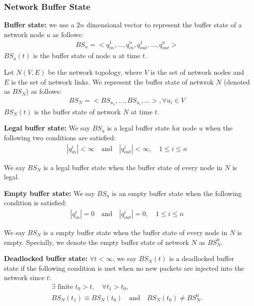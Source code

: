     
   \subsubsection{Network Buffer State}
   
   \textbf{Buffer state:} we use a $2n$ dimensional vector  to represent the buffer state of a network node $u$ as follows: 
   \begin{align}
   BS_u=<q_{in}^{1}, \dots, q_{in}^{n}, q_{out}^{1}, \dots,q_{out}^{n}> \nonumber 
   	\end{align}
   	$BS_u(t)$ is the buffer state of node $u$ at time $t$.
   
   Let $N(V,E)$ be the network topology, where $V$ is the set of network nodes and $E$ is the set of network links. We represent the buffer state of netwrok $N$ (denoted as $BS_N$) as follows:
   \begin{align}
   BS_N=<BS_{u_1},\dots,BS_{u_i},\dots>,\forall u_i \in V \nonumber 
   \end{align}
   $BS_N(t)$ is the buffer state of network $N$ at time $t$.
   
   \textbf{Legal buffer state:} We say $BS_u$ is a legal buffer state for node $u$ when the following two conditions are satisfied:
   \begin{align} \label{eqn:legalstatecon}
    |q_{in}^{i}|<\infty\quad  \text{and}\quad   |q_{out}^{i}|<\infty, \quad 1\leq i \leq n
   \end{align}
   
   We say $BS_N$ is a legal buffer state when the buffer state of every node in $N$ is legal.
   
   \textbf{Empty buffer state:} We say $BS_u$ is an empty buffer state when the following condition is satisfied:
    \begin{align} \label{eqn:emptystatecon}
    |q_{in}^{i}|=0\quad  \text{and}\quad   |q_{out}^{i}|=0, \quad 1\leq i \leq n 
    \end{align}
    
    We say $BS_N$ is a empty buffer state when the buffer state of every node in $N$ is empty. Specially, we denote the empty buffer state of network $N$ as $BS^0_N$.
    
  \textbf{Deadlocked buffer state:} $\forall t< \infty$, we say $BS_N(t)$ is a deadlocked buffer state if the following condition is met when no new packets are injected into the network since $t$:
  \begin{align} \label{eqn:deadlockstatedef}
  \exists \text{ finite } t_0 > t, \quad \forall t_1>t_0, \nonumber\\
  BS_N(t_1)\equiv BS_N(t_0) \quad \text{and} \quad BS_N(t_0) \neq BS^0_N.
  \end{align}
    
